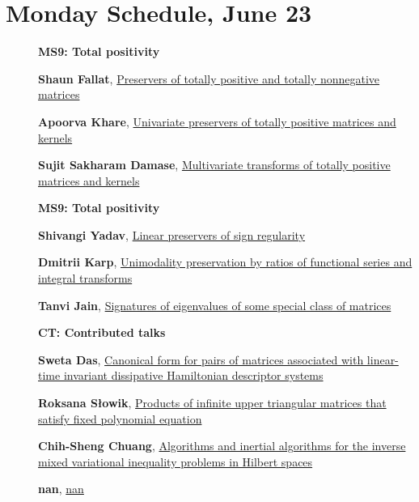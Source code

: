 \documentclass[ILAS2025-program.tex]{subfiles}
\begin{document}
\section*{Monday Schedule, June 23 }
        
        \begin{description}
    \item[] {\color{mstitle}\textbf{MS9: Total positivity}} 
    \item[] \hypertarget{up0010}{}\textbf{Shaun Fallat}, \hyperlink{down0010}{Preservers of totally positive and totally nonnegative matrices}
        \item[] \hypertarget{up0011}{}\textbf{Apoorva Khare}, \hyperlink{down0011}{Univariate preservers of totally positive matrices and kernels
}
        \item[] \hypertarget{up0012}{}\textbf{Sujit Sakharam Damase}, \hyperlink{down0012}{Multivariate transforms of totally positive matrices and kernels
}
        \end{description}
    \begin{description}
    \item[] {\color{mstitle}\textbf{MS9: Total positivity}} 
    \item[] \hypertarget{up0043}{}\textbf{Shivangi Yadav}, \hyperlink{down0043}{Linear preservers of sign regularity}
        \item[] \hypertarget{up0044}{}\textbf{Dmitrii Karp}, \hyperlink{down0044}{Unimodality preservation by ratios of functional series and integral transforms}
        \item[] \hypertarget{up0045}{}\textbf{Tanvi Jain}, \hyperlink{down0045}{Signatures of eigenvalues of some special class of matrices}
        \end{description}
    \begin{description}
    \item[] {\color{mstitle}\textbf{CT: Contributed talks}} 
    \item[] \hypertarget{up0076}{}\textbf{Sweta Das}, \hyperlink{down0076}{Canonical form for pairs of matrices associated with linear-time invariant dissipative Hamiltonian descriptor systems}
        \item[] \hypertarget{up0077}{}\textbf{Roksana Słowik}, \hyperlink{down0077}{Products of infinite upper triangular matrices that satisfy fixed polynomial equation}
        \item[] \hypertarget{up0078}{}\textbf{Chih-Sheng Chuang}, \hyperlink{down0078}{Algorithms and inertial algorithms for the inverse mixed variational inequality problems in Hilbert spaces}
        \item[] \hypertarget{up0079}{}\textbf{nan}, \hyperlink{down0079}{nan}
        \end{description}
    \newpage
\end{document}
